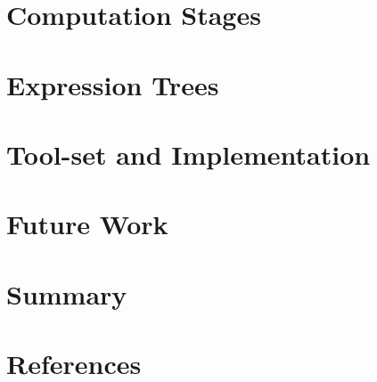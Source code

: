\documentclass[final,3p,times,12pt]{elsarticle}
\begin{document}
\section{Computation Stages}


\section{Expression Trees}


\section{Tool-set and Implementation}


\section{Future Work}


\section{Summary}

\section*{References}




\end{document}
